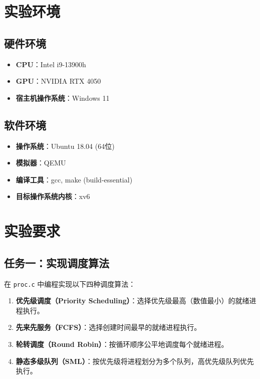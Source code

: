 \documentclass[a4paper, 12pt]{article}
\begin{document}
    \section{实验环境}
    
    \subsection{硬件环境}
    \begin{itemize}[label=\textbullet, itemsep=0pt]
        \item \textbf{CPU}：Intel i9-13900h
        \item \textbf{GPU}：NVIDIA RTX 4050
        \item \textbf{宿主机操作系统}：Windows 11
    \end{itemize}
    
    \subsection{软件环境}
    \begin{itemize}[label=\textbullet, itemsep=0pt]
        \item \textbf{操作系统}：Ubuntu 18.04 (64位)
        \item \textbf{模拟器}：QEMU
        \item \textbf{编译工具}：gcc, make (build-essential)
        \item \textbf{目标操作系统内核}：xv6
    \end{itemize}
    
    \section{实验要求}
    
    \subsection{任务一：实现调度算法}
    在 \texttt{proc.c} 中编程实现以下四种调度算法：
    \begin{enumerate}
        \item \textbf{优先级调度（Priority Scheduling）}：选择优先级最高（数值最小）的就绪进程执行。
        \item \textbf{先来先服务（FCFS）}：选择创建时间最早的就绪进程执行。
        \item \textbf{轮转调度（Round Robin）}：按循环顺序公平地调度每个就绪进程。
        \item \textbf{静态多级队列（SML）}：按优先级将进程划分为多个队列，高优先级队列优先执行。
    \end{enumerate}
    
\end{document}
